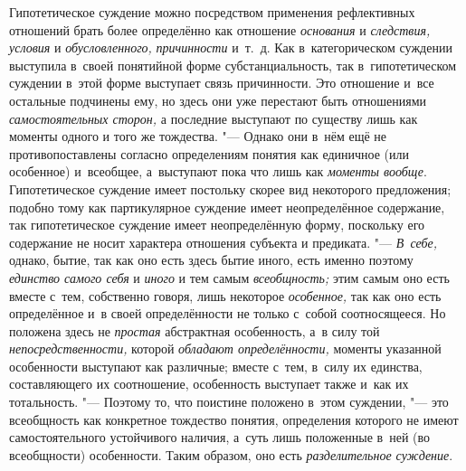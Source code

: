 Гипотетическое суждение можно посредством применения
рефлективных отношений брать более определённо как отношение
{\em основания} и {\em следствия, условия} и {\em обусловленного,}
{\em причинности} и~т.~д.
Как в~категорическом суждении выступила в~своей понятийной форме
субстанциальность, так в~гипотетическом суждении в~этой форме выступает
связь причинности. Это отношение и~все остальные подчинены ему, но здесь
они уже перестают быть отношениями
{\em самостоятельных сторон,}
а последние выступают по существу лишь как моменты одного и
того же тождества. "--- Однако они в~нём ещё не
противопоставлены согласно определениям понятия как единичное (или
особенное) и~всеобщее, а~выступают пока что лишь как
{\em моменты вообще}.
Гипотетическое суждение имеет постольку скорее вид некоторого
предложения; подобно тому как партикулярное суждение имеет неопределённое
содержание, так гипотетическое суждение имеет неопределённую форму,
поскольку его содержание не носит характера отношения субъекта и
предиката. "--- {\em В~себе,}
однако, бытие, так как оно есть здесь бытие иного, есть
именно поэтому {\em единство самого
себя} и {\em иного}
и тем самым
{\em всеобщность;} этим
самым оно есть вместе с~тем, собственно говоря, лишь некоторое
{\em особенное,} так как
оно есть определённое и~в своей определённости не только с~собой
соотносящееся. Но положена здесь не
{\em простая} абстрактная
особенность, а~в силу той
{\em непосредственности,}
которой {\em обладают
определённости,} моменты указанной особенности выступают как
различные; вместе с~тем, в~силу их единства, составляющего их соотношение,
особенность выступает также и~как их тотальность. "---
Поэтому то, что поистине положено в~этом суждении, "---
это всеобщность как конкретное тождество понятия,
определения которого не имеют самостоятельного устойчивого наличия, а~суть
лишь положенные в~ней (во всеобщности) особенности. Таким образом, оно есть
{\em разделительное суждение}.


